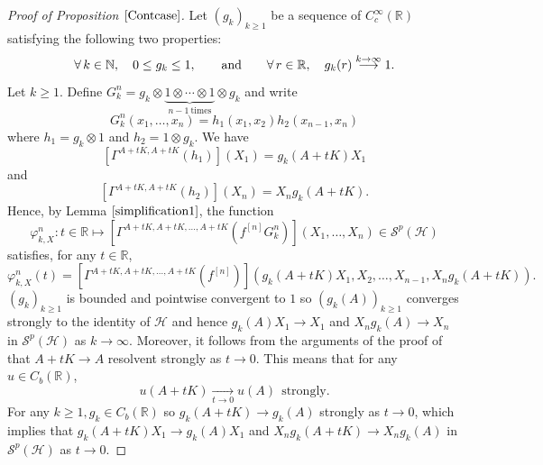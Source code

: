 \documentclass[12pt]{amsart}
\theoremstyle{remark}
\newcommand{\N}{\mbox{${\mathbb N}$}}
\begin{document}
\begin{proof}[Proof of Proposition $\ref{Contcase}$]
Let $(g_k)_{k\geq 1}$ be a sequence of $C^{\infty}_c(\mathbb{R})$ satisfying the following two properties:
$$
\forall\, k\in\N, \quad 0\leq g_k\leq 1,
\qquad\hbox{and}\qquad\forall\, r\in \mathbb{R},\quad
g_k(r)\overset{k\to\infty}{\longrightarrow} 1.
$$
Let $k\geq 1$. Define $G_k^n = g_k \otimes \underbrace{1 \otimes \cdots \otimes 1}_{n-1 \ \text{times}} \otimes g_k$ and write
$$
G_k^n(x_1, \ldots, x_n) = h_1(x_1,x_2) h_2(x_{n-1},x_n)
$$
where $h_1 = g_k \otimes 1$ and $h_2 = 1 \otimes g_k$. We have
$$
\left[\Gamma^{A+tK, A+tK}(h_1)\right](X_1) = g_k(A+tK) X_1
$$
and
$$\left[\Gamma^{A+tK, A+tK}(h_2)\right](X_n) = X_n g_k(A+tK).
$$
Hence, by Lemma $\ref{simplification1}$, the function
$$
\varphi_{k,X}^n : t \in \mathbb{R} \mapsto \left[ \Gamma^{A+tK, A+tK, \ldots, A+tK}(f^{[n]}G_k^n) \right] (X_1, \ldots, X_n) \in \mathcal{S}^p(\mathcal{H})
$$
satisfies, for any $t\in \mathbb{R}$,
$$
\varphi_{k,X}^n(t) = \left[ \Gamma^{A+tK, A+tK, \ldots, A+tK}(f^{[n]}) \right](g_k(A+tK) X_1, X_2, \ldots, X_{n-1}, X_n g_k(A+tK)).
$$
$(g_k)_{k\geq 1}$ is bounded and pointwise convergent to $1$ so $(g_k(A))_{k\geq 1}$ converges strongly to the identity of $\mathcal{H}$ and hence $g_k(A) X_1 \to X_1$ and $X_n g_k(A) \to X_n$ in $\mathcal{S}^p(\mathcal{H})$ as $k\to \infty$. Moreover, it follows from the arguments of the proof of \cite[Lemma 3.4]{CLSS} that $A + tK \to A$ resolvent strongly as $t \to 0$. This means that for any $u \in C_b(\mathbb{R})$,
$$
u(A+tK) \underset{t \to 0}{\longrightarrow} u(A) \ \ \text{strongly}.
$$
For any $k\geq 1, g_k \in C_b(\mathbb{R})$ so $g_k(A+tK) \to g_k(A)$ strongly as $t \to 0$, which implies that $g_k(A+tK) X_1 \to g_k(A) X_1$ and $X_n g_k(A+tK) \to X_n g_k(A)$ in $\mathcal{S}^p(\mathcal{H})$ as $t\to 0$.


\end{proof}
\end{document}

